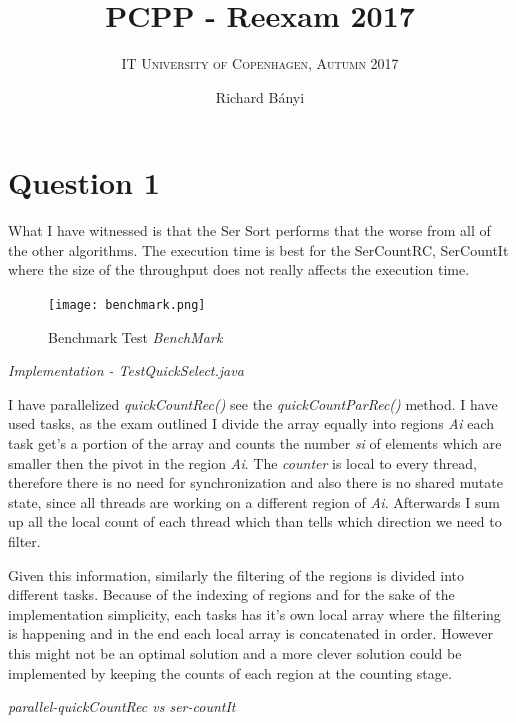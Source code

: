 \documentclass[format=acmsmall, review=false, screen=true]{acmart}
\author{Richard Bányi}
\title{\textsc{PCPP} - Reexam 2017}
\subtitle{\textsc{IT University of Copenhagen, Autumn 2017}}
\begin{document}
\maketitle 

\section{Question 1}

What I have witnessed is that the Ser Sort performs that the worse from all of the other algorithms. The execution time is best for the SerCountRC, SerCountIt where the size of the throughput does not really affects the execution time.

\begin{figure}
  \texttt{[image: benchmark.png]}
  \caption{Benchmark Test \textit{BenchMark}}
  \label{fig:benchmark}
\end{figure}

\textit{Implementation - TestQuickSelect.java}

I have parallelized \textit{quickCountRec()}  see the \textit{quickCountParRec()} method.
I have used tasks, as the exam outlined I divide the array equally into regions \textit{Ai} each task get's a portion of the array and counts the number \textit{si} of elements which are smaller then the pivot in the region \textit{Ai}. The \textit{counter} is local to every thread, therefore there is no need for synchronization and also there is no shared mutate state, since all threads are working on a different region of \textit{Ai}. Afterwards I sum up all the local count of each thread which than tells which direction we need to filter.

Given this information, similarly the filtering of the regions is divided into different tasks. Because of the indexing of regions and for the sake of the implementation simplicity, each tasks has it's own local array where the filtering is happening and in the end each local array is concatenated in order. However this might not be an optimal solution and a more clever solution could be implemented by keeping the counts of each region at the counting stage.

\textit{parallel-quickCountRec vs ser-countIt}
\end{document}
